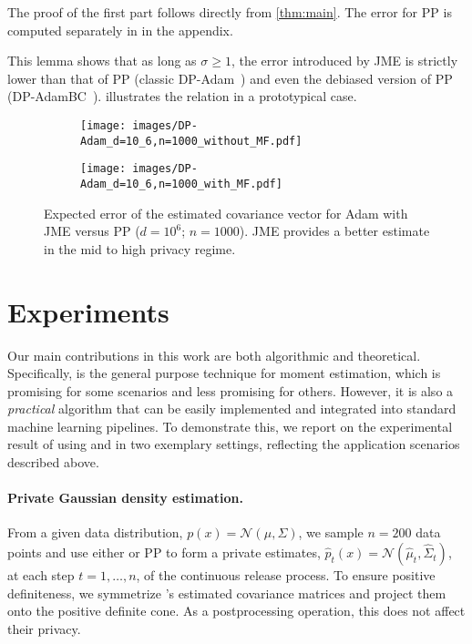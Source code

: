 The proof of the first part follows directly from \cref{thm:main}. The error for PP is computed separately in  in the appendix.

This lemma shows that as long as $\sigma \geq 1$, the error introduced by JME is strictly lower than that of PP (\ie classic DP-Adam~\citep{li2022large}) and even the debiased version of PP (\ie DP-AdamBC~\citep{dp_adam_is_not_adam}).  illustrates the relation 
in a prototypical case.

\begin{figure}[t]
    \centering\scriptsize
    \begin{subfigure}[c]{.48\linewidth}\scriptsize
        \texttt{[image: images/DP-Adam\_d=10\_6,n=1000\_without\_MF.pdf]}
    \end{subfigure}
    \begin{subfigure}[c]{0.48\linewidth}
        \texttt{[image: images/DP-Adam\_d=10\_6,n=1000\_with\_MF.pdf]}
    \end{subfigure}
    \caption{Expected error of the estimated covariance vector for Adam with JME versus PP
    ($d=10^6$; $n=1000$). JME provides a better estimate in the mid to high privacy regime.}
    \label{fig:DP-Adam_error}
\end{figure}

\section{Experiments}
Our main contributions in this work are both algorithmic and theoretical. Specifically, 
\acronym is the general purpose technique for moment estimation, which is promising for some scenarios and less promising for others. 
%
However, it is also a \emph{practical} algorithm that can be easily implemented
and integrated into standard machine learning pipelines. 
%
To demonstrate this, we report on the experimental result of using  and  in two exemplary settings, reflecting the application scenarios described above.

\paragraph{Private Gaussian density estimation.}
%
From a given data distribution, $p(x)=\mathcal{N}(\mu,\Sigma)$, we sample $n=200$ data 
points and use either \acronym or PP to form a private estimates, $\widehat p_t(x)=\mathcal{N}(\widehat\mu_t,\widehat\Sigma_t)$, at each step $t=1,\dots,n$, of the continuous release process.
%
To ensure positive definiteness, we symmetrize \acronym's estimated covariance 
matrices and project them onto the positive definite cone. As a postprocessing 
operation, this does not affect their privacy.

